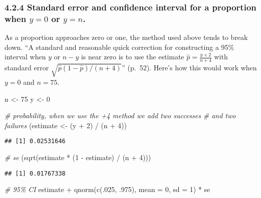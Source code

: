 \documentclass[
]{article}
\newenvironment{Shaded}{\begin{snugshade}}{\end{snugshade}}
\newcommand{\AttributeTok}[1]{\textcolor[rgb]{0.77,0.63,0.00}{#1}}
\newcommand{\CommentTok}[1]{\textcolor[rgb]{0.56,0.35,0.01}{\textit{#1}}}
\newcommand{\DecValTok}[1]{\textcolor[rgb]{0.00,0.00,0.81}{#1}}
\newcommand{\FunctionTok}[1]{\textcolor[rgb]{0.00,0.00,0.00}{#1}}
\newcommand{\NormalTok}[1]{#1}
\newcommand{\OtherTok}[1]{\textcolor[rgb]{0.56,0.35,0.01}{#1}}
\newcommand{\SpecialCharTok}[1]{\textcolor[rgb]{0.00,0.00,0.00}{#1}}
\begin{document}
\hypertarget{standard-error-and-confidence-interval-for-a-proportion-when-y-0-or-y-n.}{%
\subsubsection{\texorpdfstring{4.2.4 Standard error and confidence
interval for a proportion when \(y = 0\) or
\(y = n\).}{4.2.4 Standard error and confidence interval for a proportion when y = 0 or y = n.}}\label{standard-error-and-confidence-interval-for-a-proportion-when-y-0-or-y-n.}}

As a proportion approaches zero or one, the method used above tends to
break down. ``A standard and reasonable quick correction for
constructing a 95\% interval when \(y\) or \(n - y\) is near zero is to
use the estimate \(\hat p = \frac{y + 2}{n + 4}\) with standard error
\(\sqrt{\hat p(1 − \hat p)/(n + 4)}\)'' (p.~52). Here's how this would
work when \(y = 0\) and \(n = 75\).

\begin{Shaded}
\begin{Highlighting}[]
\NormalTok{n }\OtherTok{\textless{}{-}} \DecValTok{75}
\NormalTok{y }\OtherTok{\textless{}{-}} \DecValTok{0}

\CommentTok{\# probability, when we use the +4 method we add two successes}
\CommentTok{\# and two failures}
\NormalTok{(estimate }\OtherTok{\textless{}{-}}\NormalTok{ (y }\SpecialCharTok{+} \DecValTok{2}\NormalTok{) }\SpecialCharTok{/}\NormalTok{ (n }\SpecialCharTok{+} \DecValTok{4}\NormalTok{))}
\end{Highlighting}
\end{Shaded}

\begin{verbatim}
## [1] 0.02531646
\end{verbatim}

\begin{Shaded}
\begin{Highlighting}[]
\CommentTok{\# se}
\NormalTok{(}\FunctionTok{sqrt}\NormalTok{(estimate }\SpecialCharTok{*}\NormalTok{ (}\DecValTok{1} \SpecialCharTok{{-}}\NormalTok{ estimate) }\SpecialCharTok{/}\NormalTok{ (n }\SpecialCharTok{+} \DecValTok{4}\NormalTok{)))}
\end{Highlighting}
\end{Shaded}

\begin{verbatim}
## [1] 0.01767338
\end{verbatim}

\begin{Shaded}
\begin{Highlighting}[]
\CommentTok{\# 95\% CI}
\NormalTok{estimate }\SpecialCharTok{+} \FunctionTok{qnorm}\NormalTok{(}\FunctionTok{c}\NormalTok{(.}\DecValTok{025}\NormalTok{, .}\DecValTok{975}\NormalTok{), }\AttributeTok{mean =} \DecValTok{0}\NormalTok{, }\AttributeTok{sd =} \DecValTok{1}\NormalTok{) }\SpecialCharTok{*}\NormalTok{ se}
\end{Highlighting}
\end{Shaded}
\end{document}
